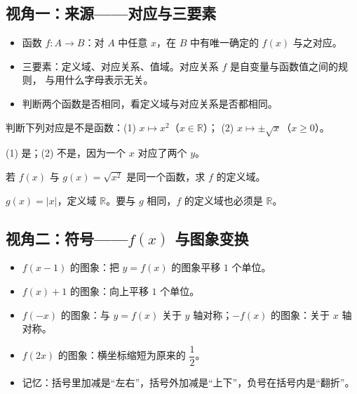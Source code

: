 \begin{explore}

\subsection{视角一：来源——对应与三要素}

\begin{itemize}
  \item 函数 $f:A\to B$：对 $A$ 中任意 $x$，在 $B$ 中有唯一确定的 $f(x)$ 与之对应。
  \item 三要素：定义域、对应关系、值域。对应关系 $f$ 是自变量与函数值之间的规则，
        与用什么字母表示无关。
  \item 判断两个函数是否相同，看定义域与对应关系是否都相同。
\end{itemize}

\begin{example}
判断下列对应是不是函数：(1) $x\mapsto x^2$（$x\in\mathbb{R}$）；
(2) $x\mapsto\pm\sqrt{x}$（$x\geq0$）。
\end{example}
\begin{solution}
(1) 是；(2) 不是，因为一个 $x$ 对应了两个 $y$。
\end{solution}

\begin{problem}
若 $f(x)$ 与 $g(x)=\sqrt{x^2}$ 是同一个函数，求 $f$ 的定义域。
\end{problem}
\begin{solution}
$g(x)=|x|$，定义域 $\mathbb{R}$。要与 $g$ 相同，$f$ 的定义域也必须是 $\mathbb{R}$。
\end{solution}

\subsection{视角二：符号——$f(x)$ 与图象变换}

\begin{itemize}
  \item $f(x-1)$ 的图象：把 $y=f(x)$ 的图象平移 $1$ 个单位。
  \item $f(x)+1$ 的图象：向上平移 $1$ 个单位。
  \item $f(-x)$ 的图象：与 $y=f(x)$ 关于 $y$ 轴对称；$-f(x)$ 的图象：关于 $x$ 轴对称。
  \item $f(2x)$ 的图象：横坐标缩短为原来的 $\dfrac12$。
  \item 记忆：括号里加减是“左右”，括号外加减是“上下”，负号在括号内是“翻折”。
\end{itemize}


\end{explore}
